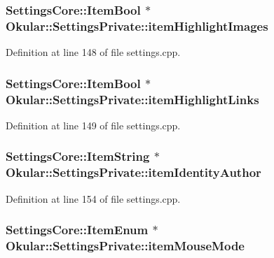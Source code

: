 \hypertarget{classOkular_1_1SettingsPrivate_af3f1a9c4948bb1310b04cb379202d332}{
\subsubsection[{item\+Highlight\+Images}]{\setlength{\rightskip}{0pt plus 5cm}Settings\+Core\+::\+Item\+Bool $\ast$ Okular\+::\+Settings\+Private\+::item\+Highlight\+Images}}\label{classOkular_1_1SettingsPrivate_af3f1a9c4948bb1310b04cb379202d332}


Definition at line 148 of file settings.\+cpp.

\hypertarget{classOkular_1_1SettingsPrivate_a8591ce945239814a8fa2059d6745285d}{
\subsubsection[{item\+Highlight\+Links}]{\setlength{\rightskip}{0pt plus 5cm}Settings\+Core\+::\+Item\+Bool $\ast$ Okular\+::\+Settings\+Private\+::item\+Highlight\+Links}}\label{classOkular_1_1SettingsPrivate_a8591ce945239814a8fa2059d6745285d}


Definition at line 149 of file settings.\+cpp.

\hypertarget{classOkular_1_1SettingsPrivate_a3e96a0f77a09d9d3b33cea85c9d78087}{
\subsubsection[{item\+Identity\+Author}]{\setlength{\rightskip}{0pt plus 5cm}Settings\+Core\+::\+Item\+String $\ast$ Okular\+::\+Settings\+Private\+::item\+Identity\+Author}}\label{classOkular_1_1SettingsPrivate_a3e96a0f77a09d9d3b33cea85c9d78087}


Definition at line 154 of file settings.\+cpp.

\hypertarget{classOkular_1_1SettingsPrivate_ae13f858f8dd1e530090ff4f063632dcd}{
\subsubsection[{item\+Mouse\+Mode}]{\setlength{\rightskip}{0pt plus 5cm}Settings\+Core\+::\+Item\+Enum $\ast$ Okular\+::\+Settings\+Private\+::item\+Mouse\+Mode}}\label{classOkular_1_1SettingsPrivate_ae13f858f8dd1e530090ff4f063632dcd}


